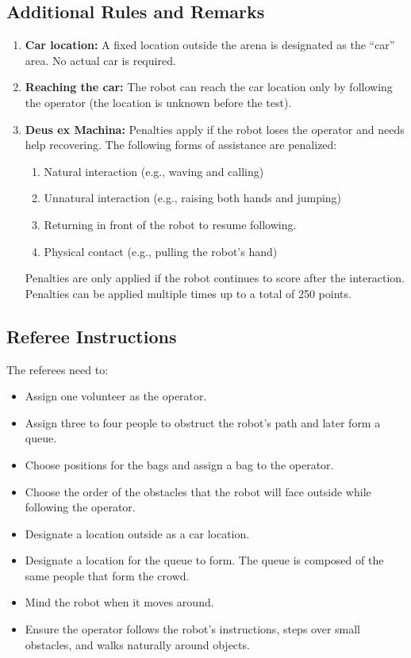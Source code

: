 \subsection*{Additional Rules and Remarks}
\begin{enumerate}[nosep]

	\item \textbf{Car location:} A fixed location outside the arena is designated as the “car” area. No actual car is required.

	\item \textbf{Reaching the car:} The robot can reach the car location only by following the operator (the location is unknown before the test).

	\item \textbf{Deus ex Machina:} Penalties apply if the robot loses the operator and needs help recovering. The following forms of assistance are penalized:
    \begin{enumerate}
     \item Natural interaction (e.g., waving and calling)
     \item Unnatural interaction (e.g., raising both hands and jumping)
	 \item Returning in front of the robot to resume following.
     \item Physical contact (e.g., pulling the robot's hand)
    \end{enumerate}
	Penalties are only applied if the robot continues to score after the interaction. Penalties can be applied multiple times up to a total of 250 points.
\end{enumerate}


\subsection*{Referee Instructions}

The referees need to:
\begin{itemize}[nosep]
	\item Assign one volunteer as the operator.
	\item Assign three to four people to obstruct the robot's path and later form a queue.
	\item Choose positions for the bags and assign a bag to the operator.
	\item Choose the order of the obstacles that the robot will face outside while following the operator.
	\item Designate a location outside as a car location.
	\item Designate a location for the queue to form. The queue is composed of the same people that form the crowd.
	\item Mind the robot when it moves around.
	\item Ensure the operator follows the robot's instructions, steps over small obstacles, and walks naturally around objects.
\end{itemize}

